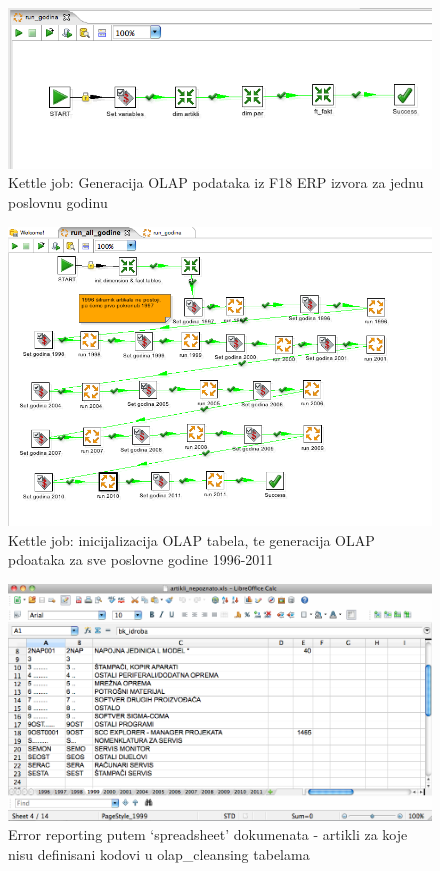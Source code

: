 \documentclass[times, utf8, seminar]{fit}
\begin{document}
\begin{figure}[H]
\centering
\includegraphics[width=15cm]{img/kettle_job_run_godina.png}
\caption{Kettle job: Generacija OLAP podataka iz F18 ERP izvora za jednu poslovnu godinu}
\end{figure}


\begin{figure}[H]
\centering
\includegraphics[width=15cm]{img/kettle_job_run_all.png}
\caption{Kettle job: inicijalizacija OLAP tabela, te generacija OLAP pdoataka za sve poslovne godine 1996-2011}
\end{figure}


\begin{figure}[H]
\centering
\includegraphics[width=15cm]{img/nepoznato_artikli.png}
\caption{Error reporting putem `spreadsheet' dokumenata - artikli za koje nisu definisani kodovi u olap\_cleansing tabelama}
\end{figure}
\end{document}
